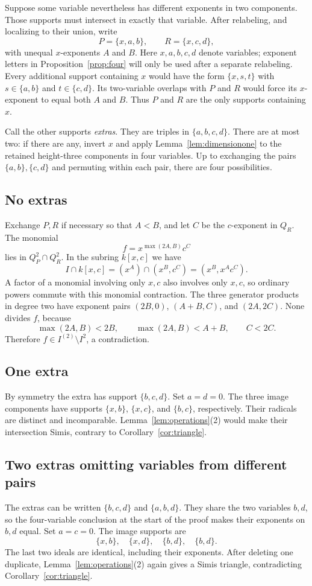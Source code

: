 \documentclass[11pt]{article}
\begin{document}
Suppose some variable nevertheless has different exponents in two
components. Those supports must intersect in exactly that variable.
After relabeling, and localizing to their union, write
\[
 P=\{x,a,b\},\qquad R=\{x,c,d\},
\]
with unequal $x$-exponents $A$ and $B$. Here $x,a,b,c,d$ denote
variables; exponent letters in Proposition~\ref{prop:four} will
only be used after a separate relabeling. Every additional support
containing $x$ would have the form $\{x,s,t\}$ with
$s\in\{a,b\}$ and $t\in\{c,d\}$. Its two-variable overlaps with
$P$ and $R$ would force its $x$-exponent to equal both $A$ and $B$.
Thus $P$ and $R$ are the only supports containing $x$.

Call the other supports \emph{extras}. They are triples in
$\{a,b,c,d\}$. There are at most two: if there are any, invert $x$
and apply Lemma~\ref{lem:dimensionone} to the retained height-three
components in four variables. Up to exchanging the pairs
$\{a,b\},\{c,d\}$ and permuting within each pair, there are four
possibilities.

\subsection*{No extras}
Exchange $P,R$ if necessary so that $A<B$, and let $C$ be the
$c$-exponent in $Q_R$. The monomial
\[
 f=x^{\max(2A,B)}c^C
\]
lies in $Q_P^2\cap Q_R^2$. In the subring $k[x,c]$ we have
\[
 I\cap k[x,c]=(x^A)\cap(x^B,c^C)=(x^B,x^Ac^C).
\]
A factor of a monomial involving only $x,c$ also involves only $x,c$,
so ordinary powers commute with this monomial contraction. The three
generator products in degree two have exponent pairs
$(2B,0)$, $(A+B,C)$, and $(2A,2C)$. None divides $f$, because
\[
 \max(2A,B)<2B,\qquad \max(2A,B)<A+B,\qquad C<2C.
\]
Therefore $f\in I^{(2)}\setminus I^2$, a contradiction.

\subsection*{One extra}
By symmetry the extra has support $\{b,c,d\}$. Set $a=d=0$.
The three image components have supports $\{x,b\}$, $\{x,c\}$,
and $\{b,c\}$, respectively. Their radicals are distinct and
incomparable. Lemma~\ref{lem:operations}(2) would make their
intersection Simis, contrary to Corollary~\ref{cor:triangle}.

\subsection*{Two extras omitting variables from different pairs}
The extras can be written $\{b,c,d\}$ and $\{a,b,d\}$.
They share the two variables $b,d$, so the four-variable conclusion
at the start of the proof makes their exponents on $b,d$ equal.
Set $a=c=0$. The image supports are
\[
 \{x,b\},\quad\{x,d\},\quad\{b,d\},\quad\{b,d\}.
\]
The last two ideals are identical, including their exponents.
After deleting one duplicate, Lemma~\ref{lem:operations}(2)
again gives a Simis triangle, contradicting
Corollary~\ref{cor:triangle}.
\end{document}
